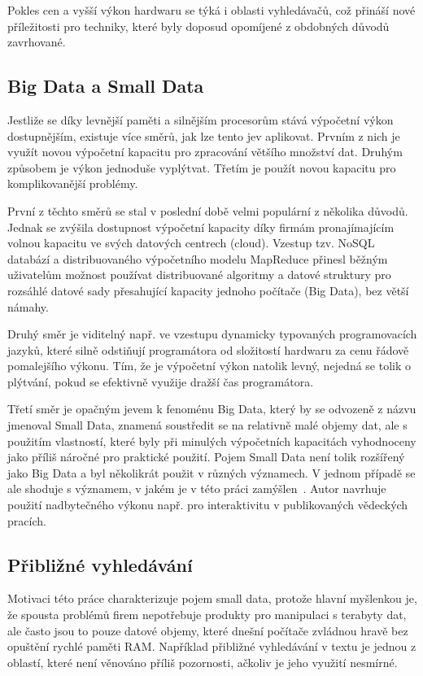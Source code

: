 \documentclass[11pt,letterpaper,oneside,openright]{book}
\begin{document}
Pokles cen a vyšší výkon hardwaru se týká i oblasti vyhledávačů, což přináší
nové příležitosti pro techniky, které byly doposud opomíjené z obdobných důvodů
zavrhované.

\subsection{Big Data a Small Data}
Jestliže se díky levnější paměti a silnějším procesorům stává výpočetní výkon
dostupnějším, existuje více směrů, jak lze tento jev aplikovat. Prvním z nich
je využít novou výpočetní kapacitu pro zpracování většího množství dat. Druhým
způsobem je výkon jednoduše vyplýtvat. Třetím je použít novou kapacitu pro
komplikovanější problémy.

První z těchto směrů se stal v poslední době velmi populární z několika důvodů.
Jednak se zvýšila dostupnost výpočetní kapacity díky firmám pronajímajícím
volnou kapacitu ve svých datových centrech (cloud). Vzestup tzv. NoSQL databází
a distribuovaného výpočetního modelu MapReduce přinesl běžným uživatelům
možnost používat distribuované algoritmy a datové struktury pro rozsáhlé datové
sady přesahující kapacity jednoho počítače (Big Data), bez větší námahy.

Druhý směr je viditelný např. ve vzestupu dynamicky typovaných programovacích
jazyků, které silně odstiňují programátora od složitostí hardwaru za cenu
řádově pomalejšího výkonu. Tím, že je výpočetní výkon natolik levný, nejedná se
tolik o plýtvání, pokud se efektivně využije dražší čas programátora. 

Třetí směr je opačným jevem k fenoménu Big Data, který by se odvozeně z názvu
jmenoval Small Data, znamená soustředit se na relativně malé objemy dat, ale s
použitím vlastností, které byly při minulých výpočetních kapacitách vyhodnoceny
jako příliš náročné pro praktické použití. Pojem Small Data není tolik
rozšířený jako Big Data a byl několikrát použit v různých významech. V jednom
případě se ale shoduje s významem, v jakém je v této práci
zamýšlen~\cite{small_data}. Autor navrhuje použití nadbytečného výkonu např.
pro interaktivitu v publikovaných vědeckých pracích. 

\subsection{Přibližné vyhledávání}
Motivaci této práce charakterizuje pojem small data, protože hlavní myšlenkou
je, že spousta problémů firem nepotřebuje produkty pro manipulaci s terabyty
dat, ale často jsou to pouze datové objemy, které dnešní počítače zvládnou
hravě bez opuštění rychlé paměti RAM. Například přibližné vyhledávání v
textu je jednou z oblastí, které není věnováno příliš pozornosti, ačkoliv je
jeho využití nesmírné.
\end{document}
